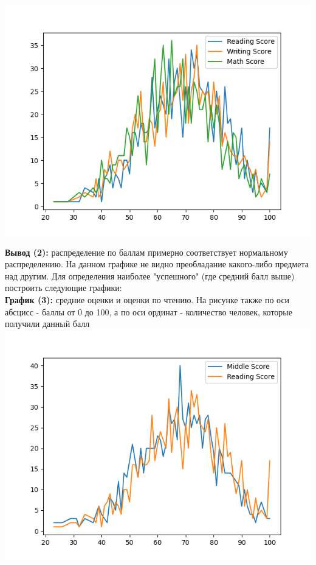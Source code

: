 \documentclass[12pt,a4paper]{article}
\begin{document}
\includegraphics{all_scores}

\large \textbf{Вывод (2):} распределение по баллам примерно соответствует нормальному распределению. На данном графике не видно преобладание какого-либо предмета над другим. Для определения наиболее "успешного" (где средний балл выше) построить следующие графики:\\

\large \textbf{График (3):} средние оценки и оценки по чтению. На рисунке также по оси абсцисс - баллы от 0 до 100, а по оси ординат - количество человек, которые получили данный балл\\
\includegraphics{middle_reading_score} 
\end{document}
